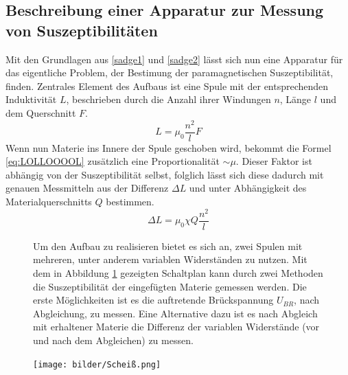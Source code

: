 \subsection{Beschreibung einer Apparatur zur Messung von Suszeptibilitäten}
Mit den Grundlagen aus \ref{sadge1} und \ref{sadge2} lässt sich nun eine Apparatur für das eigentliche Problem, der Bestimung 
der paramagnetischen Suszeptibilität, finden. 
Zentrales Element des Aufbaus ist eine Spule mit der entsprechenden Induktivität $L$, beschrieben durch die Anzahl ihrer Windungen $n$, Länge $l$
und dem Querschnitt $F$. 
\begin{equation}
    \label{eq:LOLLOOOOL}
    L = \mu_0 \frac{n^2}{l}F
\end{equation}
Wenn nun Materie ins Innere der Spule geschoben wird, bekommt die Formel \eqref{eq:LOLLOOOOL} zusätzlich eine Proportionalität 
$ \sim \mu$. Dieser Faktor ist abhängig von der Suszeptibilität selbst, folglich lässt sich diese dadurch mit genauen Messmitteln aus der Differenz $\Delta L$ und unter Abhängigkeit des Materialquerschnitts $Q$
bestimmen.
\begin{equation}
    \label{eqn:werdasliestistdummXD}
    \Delta L = \mu_0 \chi Q \frac{n^2}{l}
\end{equation}
\begin{figure}
\begin{minipage}{0.5\textwidth}
Um den Aufbau zu realisieren bietet es sich an, zwei Spulen mit mehreren, unter anderem variablen Widerständen zu nutzen.
Mit dem in Abbildung \ref{fig:scheißplan} gezeigten Schaltplan kann durch zwei Methoden die Suszeptibilität der eingefügten Materie gemessen werden.
Die erste Möglichkeiten ist es die auftretende Brückspannung $U_{BR}$, nach Abgleichung, zu messen. Eine Alternative dazu 
ist es nach Abgleich mit erhaltener Materie die Differenz der variablen Widerstände (vor und nach dem Abgleichen) zu messen.
\end{minipage}
\hfill
\begin{minipage}{0.4\textwidth}
    \texttt{[image: bilder/Scheiß.png]}
    \captionsetup{justification=centering}
    \label{fig:scheißplan}
\end{minipage}
\end{figure}

